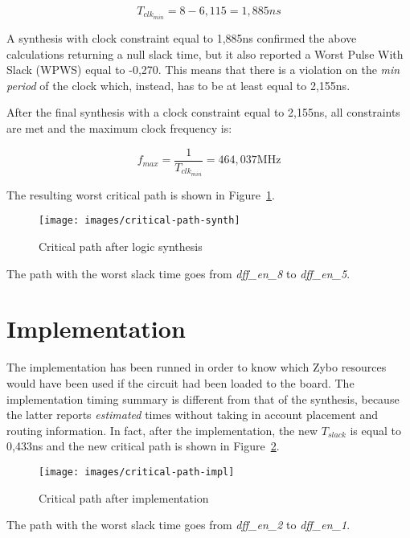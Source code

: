 \documentclass[11pt,a4paper,oneside, openright]{article}
\begin{document}
$$ T_{clk_{min}} = 8 - 6,115 = 1,885ns $$

A synthesis with clock constraint equal to 1,885ns confirmed the above calculations returning a null slack time, but it also reported a Worst Pulse With Slack (WPWS) equal to -0,270. This means that there is a violation on the \textit{min period} of the clock which, instead, has to be at least equal to 2,155ns.

After the final synthesis with a clock constraint equal to 2,155ns, all constraints are met and the maximum clock frequency is:

$$ f_{max} = \frac{1}{T_{clk_{min}}} = 464,037 \text{MHz} $$

The resulting worst critical path is shown in Figure~\ref{fig:critical-path-synth}.

\begin{figure}[h]
    \centering
    \texttt{[image: images/critical-path-synth]}
    \caption{Critical path after logic synthesis}
    \label{fig:critical-path-synth}
\end{figure}

The path with the worst slack time goes from \textit{dff\_en\_8} to \textit{dff\_en\_5}.

\newpage

\section{Implementation}
The implementation has been runned in order to know which Zybo resources would have been used if the circuit had been loaded to the board.
The implementation timing summary is different from that of the synthesis, because the latter reports \textit{estimated} times without taking in account placement and routing information. In fact, after the implementation, the new $T_{slack}$ is equal to 0,433ns and the new critical path is shown in Figure~\ref{fig:critical-path-impl}.

\begin{figure}[h]
    \centering
    \texttt{[image: images/critical-path-impl]}
    \caption{Critical path after implementation}
    \label{fig:critical-path-impl}
\end{figure}

The path with the worst slack time goes from \textit{dff\_en\_2} to \textit{dff\_en\_1}.
\end{document}
